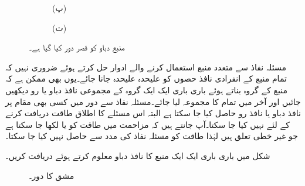 \begin{figure}
\begin{subfigure}{0.5\textwidth}
\caption*{(پ)}
\end{subfigure}%
\begin{subfigure}{0.5\textwidth}
\centering
{}
\caption*{(ت)}
\end{subfigure}%
\caption{منبع دباو کو قصر دور کیا گیا ہے۔}
\label{شکل_مسئلہ_منبع_دباو_قصر_دور_کیا_گیا_ہے}
\end{figure}

مسئلہ نفاذ سے متعدد منبع استعمال کرنے والے ادوار حل کرتے ہوئے ضروری نہیں کہ تمام منبع کے انفرادی نافذ حصوں کو علیحدہ علیحدہ جانا جائے۔یوں بھی ممکن ہے کہ منبع کے گروہ بناتے ہوئے باری باری ایک ایک گروہ کے مجموعی نافذ دباو یا رو دیکھیں جائیں اور آخر میں تمام کا مجموعہ لیا جائے۔مسئلہ نفاذ سے دور میں کسی بھی مقام پر نافذ  دباو یا نافذ رو حاصل کیا جا سکتا ہے البتہ اس مسئلے کا اطلاق طاقت دریافت کرنے کے لئے نہیں کیا جا سکتا۔آپ جانتے ہیں کہ مزاحمت میں طاقت کو  یا  لکھا جا سکتا ہے جو غیر خطی تعلق ہیں لہٰذا طاقت کو مسئلہ نفاذ کی مدد سے حاصل نہیں کیا جا سکتا۔

شکل  میں باری باری ایک ایک منبع کا نافذ دباو معلوم کرتے ہوئے  دریافت کریں۔

\begin{figure}
\centering
{}
\caption{مشق  کا دور۔}
\label{شکل_مسئلہ_باری_باری_الف}
\end{figure}

